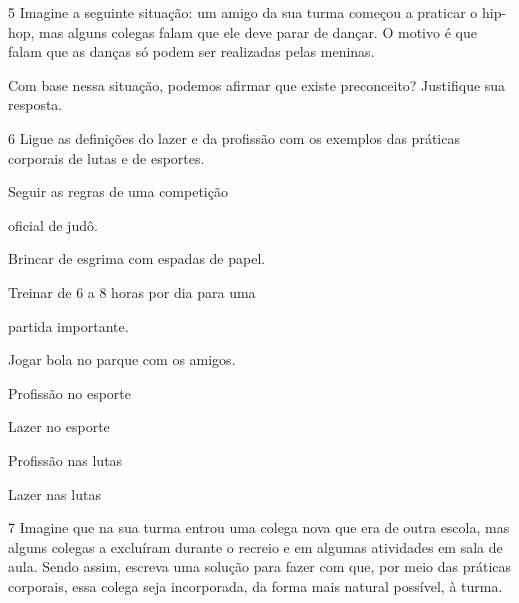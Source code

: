 

\num{5} Imagine a seguinte situação: um amigo da sua turma começou a praticar
  o hip-hop, mas alguns colegas falam que ele deve parar de dançar. O
  motivo é que falam que as danças só podem ser realizadas pelas
  meninas.

Com base nessa situação, podemos afirmar que existe preconceito?
Justifique sua resposta.


\num{6} Ligue as definições do lazer e da profissão com os exemplos das
  práticas corporais de lutas e de esportes.

\begin{multicols}{2}
Seguir as regras de uma competição

oficial de judô.\medskip

Brincar de esgrima com espadas de papel.\medskip

Treinar de 6 a 8 horas por dia para uma

partida importante. \medskip

Jogar bola no parque com os amigos.

\columnbreak

Profissão no esporte \medskip

Lazer no esporte \medskip

Profissão nas lutas \medskip

Lazer nas lutas
\end{multicols}



\num{7} Imagine que na sua turma entrou uma colega nova que era de outra escola, mas
  alguns colegas a excluíram durante o recreio e em algumas
  atividades em sala de aula. Sendo assim, escreva uma solução para fazer com
  que, por meio das práticas corporais, essa colega seja incorporada, da forma mais natural possível, à turma.

